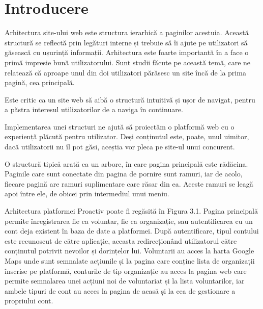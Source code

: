 \documentclass[12pt,a4paper]{report}
\begin{document}
\section{Introducere}
\par
Arhitectura site-ului web este structura ierarhică a paginilor acestuia. Această structură se reflectă prin legături interne și trebuie să îi ajute pe utilizatori să găsească cu ușurință informații. Arhitectura este foarte importantă în a face o primă impresie bună utilizatorului. Sunt studii făcute pe această temă, care ne relatează că aproape unul din doi utilizatori părăsesc un site încă de la prima pagină, cea principală.
\\\par 
Este critic ca un site web să aibă o structură intuitivă și ușor de navigat, pentru a păstra interesul utilizatorilor de a naviga în continuare.
\\\par 
Implementarea unei structuri ne ajută să proiectăm o platformă web cu o experiență plăcută pentru utilizator. Deși conținutul este, poate, unul uimitor, dacă utilizatorii nu îl pot găsi, aceștia vor pleca pe site-ul unui concurent.
\\\par 
O structură tipică arată ca un arbore, în care pagina principală este rădăcina. Paginile care sunt conectate din pagina de pornire sunt ramuri, iar de acolo, fiecare pagină are ramuri suplimentare care răsar din ea. Aceste ramuri se leagă apoi între ele, de obicei prin intermediul unui meniu.
\\\par 
Arhitectura platformei Proactiv poate fi regăsită în Figura 3.1. Pagina principală permite înregistrarea fie ca voluntar, fie ca organizație, sau autentificarea cu un cont deja existent în baza de date a platformei. După autentificare, tipul contului este recunoscut de către aplicație, aceasta redirecționând utilizatorul către conținutul potrivit nevoilor și dorințelor lui. Voluntarii au acces la harta Google Maps unde sunt semnalate acțiunile și la pagina care conține lista de organizații înscrise pe platformă, conturile de tip organizație au acces la pagina web care permite semnalarea unei acțiuni noi de voluntariat și la lista voluntarilor, iar ambele tipuri de cont au acces la pagina de acasă și la cea de gestionare a propriului cont.
\end{document}
